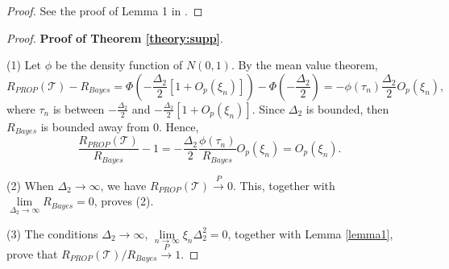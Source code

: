 \documentclass[12pt]{article}
\begin{document}
\begin{proof}{}{}
See the proof of Lemma 1 in \cite{Shao2011Sparse}.
\end{proof}


\begin{proof}{\textbf{Proof of Theorem \ref{theory:supp}}.}{}

(1) Let $\phi$ be the density function of $N(0,1)$.
By the mean value theorem,
\begin{equation*}
R_{PROP}(\mathcal{T}) - R_{Bayes} = \Phi(-\frac{\Delta_2}{2} [1 + O_p(\xi_n)]) - \Phi(-\frac{\Delta_2}{2}) = - \phi(\tau_n) \frac{\Delta_2}{2} O_p(\xi_n),
\end{equation*}
where $\tau_n$ is between $-\frac{\Delta_2}{2}$ and $-\frac{\Delta_2}{2} [1 + O_p(\xi_n)]$. Since $\Delta_2$ is bounded, then $R_{Bayes}$ is bounded away from 0.
Hence,
\begin{equation*}
\frac{R_{PROP}(\mathcal{T})}{R_{Bayes}} - 1 = - \frac{\Delta_2}{2} \frac{\phi(\tau_n)}{R_{Bayes}} O_p(\xi_n) = O_p(\xi_n).
\end{equation*}

(2) When $\Delta_2 \rightarrow \infty$, we have $R_{PROP}(\mathcal{T}) \stackrel{P}{\rightarrow} 0$.
This, together with $\lim\limits_{\Delta_2 \rightarrow \infty} R_{Bayes} = 0$,
proves (2).

(3) The conditions $\Delta_2 \rightarrow \infty$, $\lim\limits_{n \rightarrow \infty} \xi_n \Delta_2^2 = 0$, together with Lemma \ref{lemma1}, prove that $R_{PROP}(\mathcal{T}) / R_{Bayes} \stackrel{P}{\rightarrow} 1$.
\end{proof}
\end{document}
